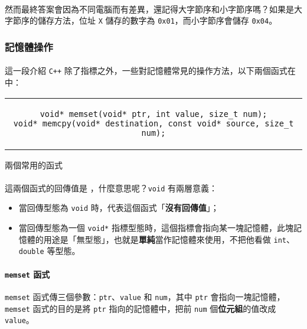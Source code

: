 \documentclass[12pt,a4paper,oneside]{article}
\begin{document}
\begin{CJK}{UTF8}{bkai}
\paragraph{}然而最終答案會因為不同電腦而有差異，還記得大字節序和小字節序嗎？如果是大字節序的儲存方法，位址 \lstinline!X! 儲存的數字為 \texttt{0x01}，而小字節序會儲存 \texttt{0x04}。

\subsubsection{記憶體操作}

\paragraph{}這一段介紹 \texttt{C++} 除了指標之外，一些對記憶體常見的操作方法，以下兩個函式在  中：

\begin{code}[h!]
\centering
\begin{tabular}{c}
\begin{lstlisting}
void* memset(void* ptr, int value, size_t num);
void* memcpy(void* destination, const void* source, size_t num);
\end{lstlisting}
\end{tabular}
\caption{兩個常用的函式}
\label{program:struct:code:memory:function}
\end{code}

\paragraph{}這兩個函式的回傳值是 ，什麼意思呢？\lstinline!void! 有兩層意義：

\begin{itemize}
\item 當回傳型態為 \lstinline!void! 時，代表這個函式「{\color{red}\textbf{沒有回傳值}}」；
\item 當回傳型態為一個 \lstinline!void*! 指標型態時，這個指標會指向某一塊記憶體，此塊記憶體的用途是「無型態」，也就是\textbf{單純}當作記憶體來使用，不把他看做 \lstinline!int!、\lstinline!double! 等型態。
\end{itemize}

\paragraph{\lstinline!memset! 函式}\lstinline!memset! 函式傳三個參數：\lstinline!ptr!、\lstinline!value! 和 \lstinline!num!，其中 \lstinline!ptr! 會指向一塊記憶體，\lstinline!memset! 函式的目的是將 \lstinline!ptr! 指向的記憶體中，把前 \lstinline!num! 個{\color{blue}\textbf{位元組}}的值改成 \lstinline!value!。


\end{CJK}
\end{document}
